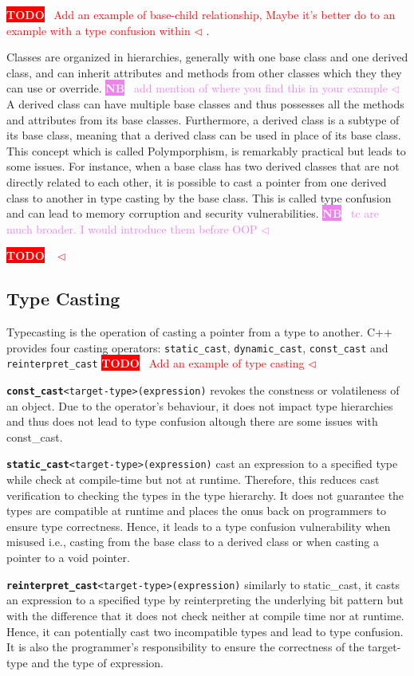 \documentclass[a4paper,11pt,oneside]{report}
\newcommand{\todobox}[3]{%
       \colorbox{#1}{\textcolor{white}{\sffamily\bfseries\scriptsize #2}}%
       ~\textcolor{#1}{#3} %
       \textcolor{#1}{$\triangleleft$}%
}
\newcommand{\nb}[1]{\todobox{violet}{NB}{#1}}
\newcommand{\adrbqt}[1]{\todobox{red}{TODO}{#1}}
\begin{document}
\adrbqt{Add an example of base-child relationship, Maybe it's better do to an example with a type confusion within}.

Classes are organized in hierarchies, generally with one base class and one derived class, and can inherit attributes and methods from other classes which they
they can use or override. \nb{add mention of where you find this in your example}A derived class can have multiple base classes and thus possesses all the methods and attributes from its base classes. 
Furthermore, a derived class is a subtype of its base class, meaning that a derived class can be used in place of its base class. This concept which is called 
Polymporphism, is remarkably practical but leads to some issues. For instance, when a base class has two derived classes that are not directly related to each other, 
it is possible to cast a pointer from one derived class to another in type casting by the base class.
This is called type confusion and can lead to memory corruption and security vulnerabilities. \nb{tc are much broader. I would introduce them before OOP}

\adrbqt{}
\subsection{Type Casting}
Typecasting is the operation of casting a pointer from a type to another. C++ provides four casting operators: \texttt{static\_cast}, \texttt{dynamic\_cast}, 
\texttt{const\_cast} and \texttt{reinterpret\_cast}
\adrbqt{Add an example of type casting}

\texttt{\textbf{const\_cast}<target-type>(expression)} revokes the constness or volatileness of an object. Due to the operator's behaviour, it does not impact type hierarchies and 
thus does not lead to type confusion altough there are some issues with const\_cast.

\texttt{\textbf{static\_cast}<target-type>(expression)} cast an expression to a specified type while check at compile-time but not at runtime. Therefore, this reduces cast verification to checking the types 
in the type hierarchy. It does not guarantee the types are compatible at runtime and places the onus back on programmers to ensure type correctness. Hence, it leads to a type confusion vulnerability when misused i.e.,
casting from the base class to a derived class or when casting a pointer to a void pointer.

\texttt{\textbf{reinterpret\_cast}<target-type>(expression)} similarly to static\_cast, it casts an expression to a specified type by reinterpreting the underlying bit pattern but with the difference 
that it does not check neither at compile time nor at runtime. Hence, it can potentially cast two incompatible types and lead to type confusion. 
It is also the programmer's responsibility to ensure the correctness of the target-type and the type of expression.
\end{document}
